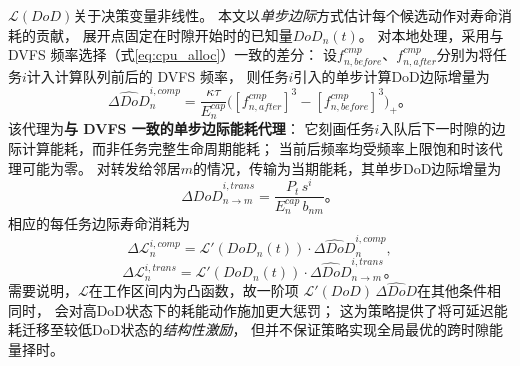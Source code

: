 \documentclass[a4paper,11pt]{article}
\begin{document}
$\mathcal{L}(DoD)$关于决策变量非线性。
本文以\emph{单步边际}方式估计每个候选动作对寿命消耗的贡献，
展开点固定在时隙开始时的已知量$DoD_n(t)$。
对本地处理，采用与 DVFS 频率选择（式\eqref{eq:cpu_alloc}）一致的差分：
设$f^{cmp}_{n,before}$、$f^{cmp}_{n,after}$分别为将任务$i$计入计算队列前后的 DVFS 频率，
则任务$i$引入的单步计算DoD边际增量为
\begin{equation}
    \widehat{\Delta DoD}^{i,comp}_n =
    \frac{\kappa\tau}{E^{cap}_n}\big(
    [f^{cmp}_{n,after}]^3 - [f^{cmp}_{n,before}]^3\big)_+。
    \label{eq:delta_dod_comp_task}
\end{equation}
该代理为\textbf{与 DVFS 一致的单步边际能耗代理}：
它刻画任务$i$入队后下一时隙的边际计算能耗，而非任务完整生命周期能耗；
当前后频率均受频率上限饱和时该代理可能为零。
对转发给邻居$m$的情况，传输为当期能耗，其单步DoD边际增量为
\begin{equation}
    \widehat{\Delta DoD}^{i,trans}_{n\to m} =
    \frac{P_t\,s^i}{E^{cap}_n\,b_{nm}}。
    \label{eq:delta_dod_trans_task}
\end{equation}
相应的每任务边际寿命消耗为
\begin{equation}
    \Delta\mathcal{L}^{i,comp}_n =
    \mathcal{L}'(DoD_n(t))\cdot\widehat{\Delta DoD}^{i,comp}_n,
    \label{eq:delta_L_comp}
\end{equation}
\begin{equation}
    \Delta\mathcal{L}^{i,trans}_n =
    \mathcal{L}'(DoD_n(t))\cdot\widehat{\Delta DoD}^{i,trans}_{n\to m}。
    \label{eq:delta_L_trans}
\end{equation}
需要说明，$\mathcal{L}$在工作区间内为凸函数，故一阶项
$\mathcal{L}'(DoD)\,\widehat{\Delta DoD}$在其他条件相同时，
会对高DoD状态下的耗能动作施加更大惩罚；
这为策略提供了将可延迟能耗迁移至较低DoD状态的\emph{结构性激励}，
但并不保证策略实现全局最优的跨时隙能量择时。
\end{document}
